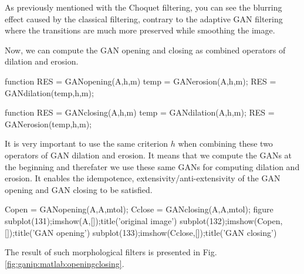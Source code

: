 \noindent As previously mentioned with the Choquet filtering, you can see the blurring effect caused by the classical filtering, contrary to the adaptive GAN filtering where the transitions are much more preserved while smoothing the image.

Now, we can compute the GAN opening and closing as combined operators of dilation and erosion.

\begin{matlab}
function RES = GANopening(A,h,m)
temp = GANerosion(A,h,m);
RES = GANdilation(temp,h,m);
\end{matlab}

\begin{matlab}
function RES = GANclosing(A,h,m)
temp = GANdilation(A,h,m);
RES = GANerosion(temp,h,m);
\end{matlab}

It is very important to use the same criterion $h$ when combining these two operators of GAN dilation and erosion. It means that we compute the GANs at the beginning and therefater we use these same GANs for computing dilation and erosion. It enables the idempotence, extensivity/anti-extensivity of the GAN opening and GAN closing to be satisfied.

\begin{matlab}
Copen = GANopening(A,A,mtol);
Cclose = GANclosing(A,A,mtol);
figure
subplot(131);imshow(A,[]);title('original image')
subplot(132);imshow(Copen,[]);title('GAN opening')
subplot(133);imshow(Cclose,[]);title('GAN closing')
\end{matlab}

\noindent The result of such morphological filters is presented in Fig.\ref{fig:ganip:matlab:openingclosing}.

